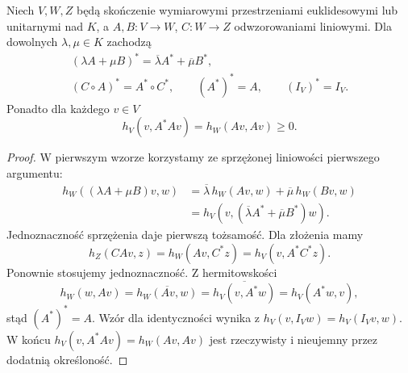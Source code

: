 \begin{stwierdzenie}
\label{prop:lin13-adjoint-kalkul}
Niech \(V,W,Z\) będą
skończenie wymiarowymi
przestrzeniami euklidesowymi
lub unitarnymi nad \(K\),
a \(A,B\colon V\to W\),
\(C\colon W\to Z\) odwzorowaniami liniowymi.
Dla dowolnych \(\lambda,\mu\in K\)
zachodzą
\[
 \begin{gathered}
 (\lambda A+\mu B)^*
   =\overline\lambda A^*+
    \overline\mu B^*,\\
 (C\circ A)^*=A^*\circ C^*,\qquad
 (A^*)^*=A,\qquad
 (I_V)^*=I_V.
 \end{gathered}
\]
Ponadto dla każdego \(v\in V\)
\[
 h_V(v,A^*Av)=h_W(Av,Av)\ge0.
\]
\end{stwierdzenie}
\begin{proof}
W pierwszym wzorze korzystamy
ze sprzężonej liniowości
pierwszego argumentu:
\[
 \begin{aligned}
 h_W((\lambda A+\mu B)v,w)
 &=\overline\lambda\,h_W(Av,w)
   +\overline\mu\,h_W(Bv,w)\\
 &=h_V(v,(\overline\lambda A^*+
                   \overline\mu B^*)w).
 \end{aligned}
\]
Jednoznaczność sprzężenia daje
pierwszą tożsamość.
Dla złożenia mamy
\[
 h_Z(CAv,z)
 =h_W(Av,C^*z)
 =h_V(v,A^*C^*z).
\]
Ponownie stosujemy jednoznaczność.
Z hermitowskości
\[
 h_W(w,Av)=\overline{h_W(Av,w)}
 =\overline{h_V(v,A^*w)}
 =h_V(A^*w,v),
\]
stąd \((A^*)^*=A\).
Wzór dla identyczności wynika
z \(h_V(v,I_Vw)=h_V(I_Vv,w)\).
W końcu
\(h_V(v,A^*Av)=h_W(Av,Av)\)
jest rzeczywisty i nieujemny
przez dodatnią określoność.
\end{proof}

